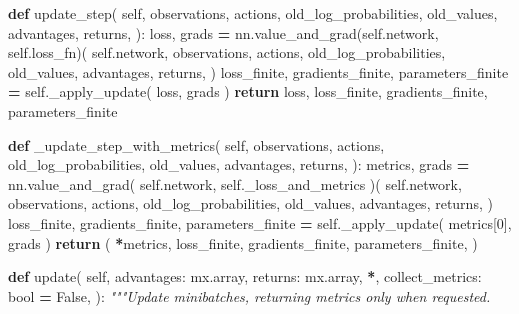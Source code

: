 \documentclass[
  american,
  11pt,
  letterpaper,
]{article}
\newenvironment{Shaded}{\begin{snugshade}}{\end{snugshade}}
\newcommand{\BuiltInTok}[1]{#1}
\newcommand{\CommentTok}[1]{\textcolor[rgb]{0.56,0.35,0.01}{\textit{#1}}}
\newcommand{\ControlFlowTok}[1]{\textcolor[rgb]{0.13,0.29,0.53}{\textbf{#1}}}
\newcommand{\DecValTok}[1]{\textcolor[rgb]{0.00,0.00,0.81}{#1}}
\newcommand{\KeywordTok}[1]{\textcolor[rgb]{0.13,0.29,0.53}{\textbf{#1}}}
\newcommand{\NormalTok}[1]{#1}
\newcommand{\OperatorTok}[1]{\textcolor[rgb]{0.81,0.36,0.00}{\textbf{#1}}}
\newcommand{\VariableTok}[1]{\textcolor[rgb]{0.00,0.00,0.00}{#1}}
\renewenvironment{Shaded}{\par\smallskip}{\par\smallskip}
\begin{document}
\begin{Shaded}
\begin{Highlighting}[]
    \KeywordTok{def}\NormalTok{ update\_step(}
        \VariableTok{self}\NormalTok{,}
\NormalTok{        observations,}
\NormalTok{        actions,}
\NormalTok{        old\_log\_probabilities,}
\NormalTok{        old\_values,}
\NormalTok{        advantages,}
\NormalTok{        returns,}
\NormalTok{    ):}
\NormalTok{        loss, grads }\OperatorTok{=}\NormalTok{ nn.value\_and\_grad(}\VariableTok{self}\NormalTok{.network, }\VariableTok{self}\NormalTok{.loss\_fn)(}
            \VariableTok{self}\NormalTok{.network,}
\NormalTok{            observations,}
\NormalTok{            actions,}
\NormalTok{            old\_log\_probabilities,}
\NormalTok{            old\_values,}
\NormalTok{            advantages,}
\NormalTok{            returns,}
\NormalTok{        )}
\NormalTok{        loss\_finite, gradients\_finite, parameters\_finite }\OperatorTok{=} \VariableTok{self}\NormalTok{.\_apply\_update(}
\NormalTok{            loss, grads}
\NormalTok{        )}
        \ControlFlowTok{return}\NormalTok{ loss, loss\_finite, gradients\_finite, parameters\_finite}

    \KeywordTok{def}\NormalTok{ \_update\_step\_with\_metrics(}
        \VariableTok{self}\NormalTok{,}
\NormalTok{        observations,}
\NormalTok{        actions,}
\NormalTok{        old\_log\_probabilities,}
\NormalTok{        old\_values,}
\NormalTok{        advantages,}
\NormalTok{        returns,}
\NormalTok{    ):}
\NormalTok{        metrics, grads }\OperatorTok{=}\NormalTok{ nn.value\_and\_grad(}
            \VariableTok{self}\NormalTok{.network, }\VariableTok{self}\NormalTok{.\_loss\_and\_metrics}
\NormalTok{        )(}
            \VariableTok{self}\NormalTok{.network,}
\NormalTok{            observations,}
\NormalTok{            actions,}
\NormalTok{            old\_log\_probabilities,}
\NormalTok{            old\_values,}
\NormalTok{            advantages,}
\NormalTok{            returns,}
\NormalTok{        )}
\NormalTok{        loss\_finite, gradients\_finite, parameters\_finite }\OperatorTok{=} \VariableTok{self}\NormalTok{.\_apply\_update(}
\NormalTok{            metrics[}\DecValTok{0}\NormalTok{], grads}
\NormalTok{        )}
        \ControlFlowTok{return}\NormalTok{ (}
            \OperatorTok{*}\NormalTok{metrics,}
\NormalTok{            loss\_finite,}
\NormalTok{            gradients\_finite,}
\NormalTok{            parameters\_finite,}
\NormalTok{        )}

    \KeywordTok{def}\NormalTok{ update(}
        \VariableTok{self}\NormalTok{,}
\NormalTok{        advantages: mx.array,}
\NormalTok{        returns: mx.array,}
        \OperatorTok{*}\NormalTok{,}
\NormalTok{        collect\_metrics: }\BuiltInTok{bool} \OperatorTok{=} \VariableTok{False}\NormalTok{,}
\NormalTok{    ):}
        \CommentTok{"""Update minibatches, returning metrics only when requested.}


\end{Highlighting}
\end{Shaded}
\end{document}
